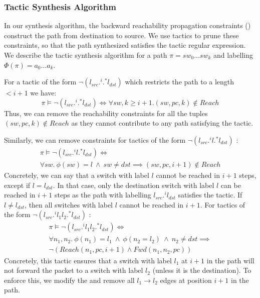 \subsubsection{Tactic Synthesis Algorithm}
In our synthesis algorithm, the backward reachability propagation constraints () 
construct the path from destination to source. We use tactics to prune these constraints, so that
the path synthesized satisfies the tactic regular expression.  
We describe the tactic synthesis algorithm
for a path $\pi = sw_0 \ldots sw_k$ and labelling $\Phi(\pi) = a_0 \ldots a_k$. 

For a tactic of the form $\neg (l_{src} .^i .^* l_{dst})$ which restricts the path to a length $ < i + 1$ we have: 
\begin{equation}
	\pi \vDash \neg (l_{src} .^i .^* l_{dst}) \Leftrightarrow \forall sw,k \geq i + 1. (sw,pc,k) \notin Reach
\end{equation}
Thus, we can remove the reachability constraints for 
all the tuples $(sw,pc,k) \notin Reach$
as they cannot contribute to any path satisfying the tactic.  

Similarly, we can remove constraints for tactics
of the form $\neg (l_{src}  .^i l .^* l_{dst})$ :
\begin{multline} \label{eq:t1}
\pi \vDash \neg (l_{src} .^i l .^* l_{dst}) \Leftrightarrow \\ \forall sw.~ \phi(sw) = l ~\wedge~ sw \not= dst \implies  (sw, pc, i + 1) \notin Reach
\end{multline}
Concretely, we can say that a switch with label $l$ cannot be reached in $i+1$
steps, except if $l = l_{dst}$. In that case,
only the destination switch with label $l$ can be reached in $i+1$ steps as 
the path with labelling $l_{src}.^i l_{dst}$ satisfies the tactic. If $l \not= l_{dst}$, then
all switches with label $l$ cannot be reached in $i+1$. \newline
For tactics of the form $\neg (l_{src}  .^i l_1 l_2 .^* l_{dst})$ : 
\begin{multline} \label{eq:t3}
\pi \vDash \neg (l_{src} .^i l_1 l_2 .^* l_{dst}) \Leftrightarrow \\ 
\forall n_1, n_2.~\phi(n_1) = l_1~\wedge~ \phi(n_2 = l_2) ~\wedge~ n_2 \not=dst  \implies \\ 
\neg (Reach(n_1, pc, i + 1) \wedge Fwd(n_1, n_2, pc))
\end{multline}
Concretely, this tactic ensures that a switch with label $l_1$ at $i+1$ in the path
will not forward the packet to a switch with label $l_2$ (unless it is the destination). 
To enforce this, we modify the  and remove all $l_1\rightarrow l_2$
edges at position $i+1$ in the path.  

